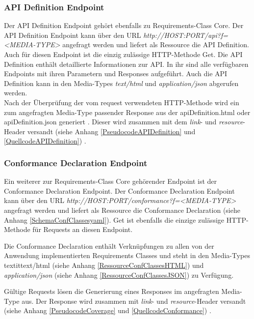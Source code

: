 \subsubsection{API Definition Endpoint}
Der API Definition Endpoint gehört ebenfalls zu Requirements-Class Core.
Der API Definition Endpoint kann über den URL \textit{http://HOST:PORT/api?f=<MEDIA-TYPE>} angefragt werden und liefert als Ressource die API Definition. 
Auch für diesen Endpoint ist die einzig zulässige HTTP-Methode Get. 
Die API Definition enthält detaillierte Informationen zur API. In ihr sind alle verfügbaren Endpoints mit ihren Parametern und Responses aufgeführt. 
Auch die API Definition kann in den Media-Types \textit{text/html} und \textit{application/json} abgerufen werden.\\
Nach der Überprüfung der vom request verwendeten HTTP-Methode wird ein zum angefragten Media-Type passender Response aus der apiDefinition.html oder 
apiDefinition.json generiert . 
Dieser wird zusammen mit dem \textit{link}- und \textit{resource}-Header versandt (siehe Anhang \ref{PseudocodeAPIDefinition} und \ref{QuellcodeAPIDefinition}) 
\cite{ogc_api_processes_core}. 

\subsubsection{Conformance Declaration Endpoint}
Ein weiterer zur Requirements-Class Core gehörender Endpoint ist der Conformance Declaration Endpoint.
Der Conformance Declaration Endpoint kann über den URL \textit{http://HOST:PORT/conformance?f=<MEDIA-TYPE>} angefragt werden und liefert als 
Ressource die Conformance Declaration (siehe Anhang \ref{SchemaConfClassesyaml}). Get ist ebenfalls die einzige zulässige HTTP-Methode für Requests an diesen Endpoint.

Die Conformance Declaration enthält Verknüpfungen zu allen von der Anwendung implementierten Requirements Classes und steht in den Media-Types textit{text/html} 
(siehe Anhang \ref{RessourceConfClassesHTML}) und \textit{application/json} (siehe Anhang \ref{RessourceConfClassesJSON}) zu Verfügung.

Gültige Requests lösen die Generierung eines Responses im angefragten Media-Type aus. 
Der Response wird zusammen mit \textit{link}- und \textit{resource}-Header versandt (siehe Anhang \ref{PseudocodeCoverage} und \ref{QuellcodeConformance})
\cite{ogc_api_processes_core}.

